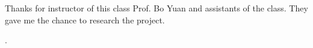 \documentclass[sigchi]{acmart}
\begin{document}
\begin{acks}
Thanks for instructor of this class Prof. Bo Yuan and assistants of the class. They gave me the chance to research the project.
\end{acks}



.
\end{document}
